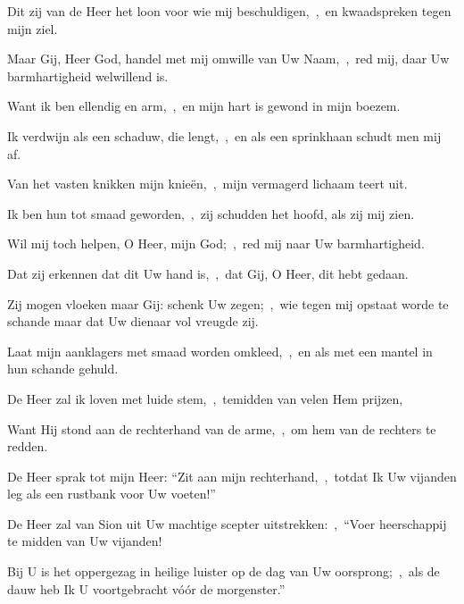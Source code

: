 \documentclass[12pt,twoside,a5paper]{article}
\begin{document}
\begin{halfparskip}
  Dit zij van de Heer het loon voor wie mij beschuldigen,~\sep\ en kwaadspreken tegen mijn ziel.

  Maar Gij, Heer God, handel met mij omwille van Uw Naam,~\sep\ red mij, daar Uw barmhartigheid welwillend is.

  Want ik ben ellendig en arm,~\sep\ en mijn hart is gewond in mijn boezem.

  Ik verdwijn als een schaduw, die lengt,~\sep\ en als een sprinkhaan schudt men mij af.

  Van het vasten knikken mijn knieën,~\sep\ mijn vermagerd lichaam teert uit.

  Ik ben hun tot smaad geworden,~\sep\ zij schudden het hoofd, als zij mij zien.

  Wil mij toch helpen, O Heer, mijn God;~\sep\ red mij naar Uw barmhartigheid.

  Dat zij erkennen dat dit Uw hand is,~\sep\ dat Gij, O Heer, dit hebt gedaan.

  Zij mogen vloeken maar Gij: schenk Uw zegen;~\sep\ wie tegen mij opstaat worde te schande maar dat Uw dienaar vol vreugde zij.

  Laat mijn aanklagers met smaad worden omkleed,~\sep\ en als met een mantel in hun schande gehuld.

  De Heer zal ik loven met luide stem,~\sep\ temidden van velen Hem prijzen,

  Want Hij stond aan de rechterhand van de arme,~\sep\ om hem van de rechters te redden.
\end{halfparskip}



\begin{halfparskip}
  De Heer sprak tot mijn Heer: ``Zit aan mijn rechterhand,~\sep\ totdat Ik Uw vijanden leg als een rustbank voor Uw voeten!''


  De Heer zal van Sion uit Uw machtige scepter uitstrekken:~\sep\ ``Voer heerschappij te midden van Uw vijanden!

  Bij U is het oppergezag in heilige luister op de dag van Uw oorsprong;~\sep\ als de dauw heb Ik U voortgebracht vóór de morgenster.''
\end{halfparskip}
\end{document}
